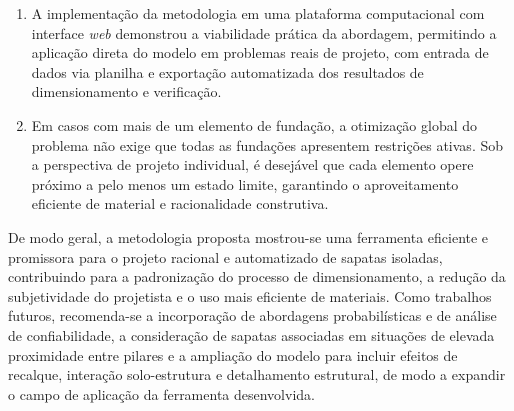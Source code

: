 \begin{enumerate}
    \item A implementação da metodologia em uma plataforma computacional com interface \textit{web} demonstrou a viabilidade prática da abordagem, permitindo a aplicação direta do modelo em problemas reais de projeto, com entrada de dados via planilha e exportação automatizada dos resultados de dimensionamento e verificação.
    \item Em casos com mais de um elemento de fundação, a otimização global do problema não exige que todas as fundações apresentem restrições ativas. Sob a perspectiva de projeto individual, é desejável que cada elemento opere próximo a pelo menos um estado limite, garantindo o aproveitamento eficiente de material e racionalidade construtiva.
   
\end{enumerate}

De modo geral, a metodologia proposta mostrou-se uma ferramenta eficiente e promissora para o projeto racional e automatizado de sapatas isoladas, contribuindo para a padronização do processo de dimensionamento, a redução da subjetividade do projetista e o uso mais eficiente de materiais. Como trabalhos futuros, recomenda-se a incorporação de abordagens probabilísticas e de análise de confiabilidade, a consideração de sapatas associadas em situações de elevada proximidade entre pilares e a ampliação do modelo para incluir efeitos de recalque, interação solo-estrutura e detalhamento estrutural, de modo a expandir o campo de aplicação da ferramenta desenvolvida.
    








